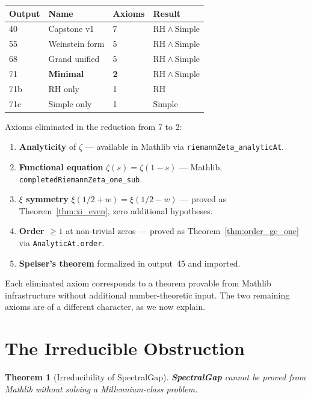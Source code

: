 \documentclass[12pt, a4paper]{article}
\theoremstyle{plain}
\newtheorem{theorem}{Theorem}[section]
\theoremstyle{definition}
\newcommand{\lean}[1]{\texttt{#1}}
\newcommand{\RH}{\mathrm{RH}}
\begin{document}
\begin{center}
\begin{tabular}{llll}
  \toprule
  Output & Name & Axioms & Result \\
  \midrule
  40  & Capstone v1    & 7 & $\RH \wedge \text{Simple}$ \\
  55  & Weinstein form & 5 & $\RH \wedge \text{Simple}$ \\
  68  & Grand unified  & 5 & $\RH \wedge \text{Simple}$ \\
  71  & \textbf{Minimal}      & \textbf{2} & $\RH \wedge \text{Simple}$ \\
  71b & RH only        & 1 & $\RH$ \\
  71c & Simple only    & 1 & $\text{Simple}$ \\
  \bottomrule
\end{tabular}
\end{center}

Axioms eliminated in the reduction from 7 to 2:
\begin{enumerate}
  \item \textbf{Analyticity} of $\zeta$ --- available in Mathlib via
        \lean{riemannZeta\_analyticAt}.
  \item \textbf{Functional equation} $\zeta(s) = \zeta(1-s)$ --- Mathlib,
        \lean{completedRiemannZeta\_one\_sub}.
  \item \textbf{$\xi$ symmetry} $\xi(1/2+w) = \xi(1/2-w)$ --- proved as
        Theorem~\ref{thm:xi_even}, zero additional hypotheses.
  \item \textbf{Order $\geq 1$} at non-trivial zeros --- proved as
        Theorem~\ref{thm:order_ge_one} via \lean{AnalyticAt.order}.
  \item \textbf{Speiser's theorem} formalized in output~45 and imported.
\end{enumerate}

Each eliminated axiom corresponds to a theorem provable from Mathlib
infrastructure without additional number-theoretic input.
The two remaining axioms are of a different character, as we now explain.

\section{The Irreducible Obstruction}
\label{sec:obstruction}

\begin{theorem}[Irreducibility of SpectralGap]
\label{thm:sg_irreducible}
\textbf{SpectralGap} cannot be proved from Mathlib without solving
a Millennium-class problem.
\end{theorem}
\end{document}
